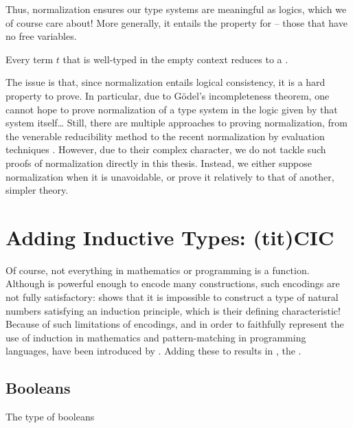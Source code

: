 \AP Thus, normalization ensures our type systems are meaningful as logics,
which we of course care about!
More generally, it entails the  property for  –
\eg those that have no free variables.%

\begin{property}
  \label{prop:canonicity}
  Every term $t$ that is well-typed in the empty context reduces to a .
\end{property}

The issue is that, since normalization entails logical consistency, it is a hard
property to prove. In particular, due to Gödel’s incompleteness theorem, one cannot hope
to prove normalization of a type system in the logic given by that system itself…
Still, there are multiple approaches to proving normalization, from the venerable
reducibility method  to the recent normalization by evaluation 
techniques . However, due to their complex character, 
we do not tackle such proofs of normalization directly in this thesis. Instead, we
either suppose normalization when it is unavoidable,
or prove it relatively to that of another, simpler theory.

\section{Adding Inductive Types: \kl(tit){CIC}}
\label{sec:tech-cic}

\AP Of course, not everything in mathematics or programming is a function.
Although  is powerful enough to encode many constructions,
such encodings are not fully satisfactory:  shows
that it is impossible to construct a type of natural numbers
satisfying an induction principle, which is their defining characteristic!
Because of such limitations of encodings, and in order to faithfully
represent the use of induction in mathematics and pattern-matching in programming languages,
 have been introduced by .
Adding these to  results in ,
the .

\subsection{Booleans}

\begin{marginfigure}
  \ContinuedFloat*
  \begin{mathpar}
    \label{rule:bool-type}
  \end{mathpar}
  \caption{The type of booleans}
  \label{fig:bool-type}
\end{marginfigure}

